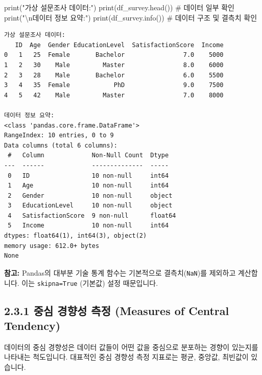 \documentclass[
  letterpaper,
]{book}
\newenvironment{Shaded}{\begin{snugshade}}{\end{snugshade}}
\newcommand{\BuiltInTok}[1]{\textcolor[rgb]{0.00,0.23,0.31}{#1}}
\newcommand{\CharTok}[1]{\textcolor[rgb]{0.13,0.47,0.30}{#1}}
\newcommand{\CommentTok}[1]{\textcolor[rgb]{0.37,0.37,0.37}{#1}}
\newcommand{\NormalTok}[1]{\textcolor[rgb]{0.00,0.23,0.31}{#1}}
\newcommand{\StringTok}[1]{\textcolor[rgb]{0.13,0.47,0.30}{#1}}
\begin{document}
\begin{Shaded}
\begin{Highlighting}[]
\BuiltInTok{print}\NormalTok{(}\StringTok{"가상 설문조사 데이터:"}\NormalTok{)}
\BuiltInTok{print}\NormalTok{(df\_survey.head()) }\CommentTok{\# 데이터 일부 확인}
\BuiltInTok{print}\NormalTok{(}\StringTok{"}\CharTok{\textbackslash{}n}\StringTok{데이터 정보 요약:"}\NormalTok{)}
\BuiltInTok{print}\NormalTok{(df\_survey.info()) }\CommentTok{\# 데이터 구조 및 결측치 확인}
\end{Highlighting}
\end{Shaded}

\begin{verbatim}
가상 설문조사 데이터:
   ID  Age  Gender EducationLevel  SatisfactionScore  Income
0   1   25  Female       Bachelor                7.0    5000
1   2   30    Male         Master                8.0    6000
2   3   28    Male       Bachelor                6.0    5500
3   4   35  Female            PhD                9.0    7500
4   5   42    Male         Master                7.0    8000

데이터 정보 요약:
<class 'pandas.core.frame.DataFrame'>
RangeIndex: 10 entries, 0 to 9
Data columns (total 6 columns):
 #   Column             Non-Null Count  Dtype  
---  ------             --------------  -----  
 0   ID                 10 non-null     int64  
 1   Age                10 non-null     int64  
 2   Gender             10 non-null     object 
 3   EducationLevel     10 non-null     object 
 4   SatisfactionScore  9 non-null      float64
 5   Income             10 non-null     int64  
dtypes: float64(1), int64(3), object(2)
memory usage: 612.0+ bytes
None
\end{verbatim}

\textbf{참고:} Pandas의 대부분 기술 통계 함수는 기본적으로
결측치(\texttt{NaN})를 제외하고 계산합니다. 이는 \texttt{skipna=True}
(기본값) 설정 때문입니다.

\subsection{2.3.1 중심 경향성 측정 (Measures of Central
Tendency)}\label{uxc911uxc2ec-uxacbduxd5a5uxc131-uxce21uxc815-measures-of-central-tendency}

데이터의 중심 경향성은 데이터 값들이 어떤 값을 중심으로 분포하는 경향이
있는지를 나타내는 척도입니다. 대표적인 중심 경향성 측정 지표로는 평균,
중앙값, 최빈값이 있습니다.
\end{document}
